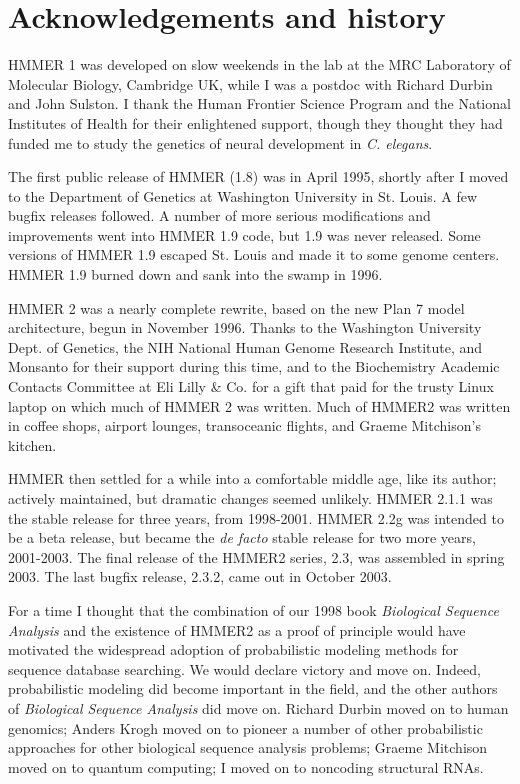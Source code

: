\chapter{Acknowledgements and history}

HMMER 1 was developed on slow weekends in the lab at the MRC
Laboratory of Molecular Biology, Cambridge UK, while I was a postdoc
with Richard Durbin and John Sulston. I thank the Human Frontier
Science Program and the National Institutes of Health for their
enlightened support, though they thought they had funded me to study
the genetics of neural development in \emph{C. elegans}.

The first public release of HMMER (1.8) was in April 1995, shortly
after I moved to the Department of Genetics at Washington University
in St. Louis. A few bugfix releases followed. A number of more serious
modifications and improvements went into HMMER 1.9 code, but 1.9 was
never released. Some versions of HMMER 1.9 escaped St. Louis and made
it to some genome centers. HMMER 1.9 burned down and sank into the
swamp in 1996.

HMMER 2 was a nearly complete rewrite, based on the new Plan 7 model
architecture, begun in November 1996. Thanks to the Washington
University Dept. of Genetics, the NIH National Human Genome Research
Institute, and Monsanto for their support during this time, and to the
Biochemistry Academic Contacts Committee at Eli Lilly \& Co. for a
gift that paid for the trusty Linux laptop on which much of HMMER 2
was written. Much of HMMER2 was written in coffee shops, airport
lounges, transoceanic flights, and Graeme Mitchison's kitchen. 

HMMER then settled for a while into a comfortable middle age, like its
author; actively maintained, but dramatic changes seemed
unlikely. HMMER 2.1.1 was the stable release for three years, from
1998-2001.  HMMER 2.2g was intended to be a beta release, but became
the \emph{de facto} stable release for two more years, 2001-2003. The
final release of the HMMER2 series, 2.3, was assembled in spring 2003.
The last bugfix release, 2.3.2, came out in October 2003.

For a time I thought that the combination of our 1998 book
\emph{Biological Sequence Analysis} and the existence of HMMER2 as a
proof of principle would have motivated the widespread adoption of
probabilistic modeling methods for sequence database searching. We
would declare victory and move on. Indeed, probabilistic modeling did
become important in the field, and the other authors of
\emph{Biological Sequence Analysis} did move on.  Richard Durbin moved
on to human genomics; Anders Krogh moved on to pioneer a number of
other probabilistic approaches for other biological sequence analysis
problems; Graeme Mitchison moved on to quantum computing; I moved on
to noncoding structural RNAs.


